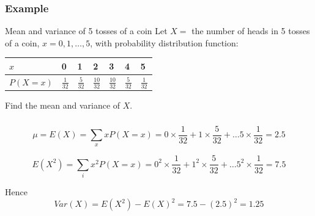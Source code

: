 \documentclass[t,xcolor=pdftex,dvipsnames,table]{beamer}
\begin{document}
\begin{frame}\frametitle{Example}
\begin{block}{Mean and variance of 5 tosses of a coin}
Let $X = $ the number of heads in 5 tosses of a coin, $x=0,1,\ldots,5$, with probability distribution function:

\begin{center}
\begin{tabular}{|l|l|l|l|l|l|l|} \hline
$x$ & 0 & 1 & 2 & 3 & 4 & 5  \\ \hline
$P(X=x)$ & $\frac{1}{32}$ & $\frac{5}{32}$ & $\frac{10}{32}$ & $\frac{10}{32}$ & $\frac{5}{32}$ & $\frac{1}{32}$  \\ \hline
\end{tabular}
\end{center}

Find the mean and variance of $X$.
\end{block}
\end{frame}

\begin{frame}\frametitle{}
\begin{alertblock}{}

\[ \mu = E(X) = \sum_{x} x P(X=x) = 0 \times \frac{1}{32} + 1 \times \frac{5}{32} + \ldots  5 \times \frac{1}{32} = 2.5 \]

\[ E(X^2) = \sum_{i} x^2 P(X=x) = 0^2 \times \frac{1}{32} + 1^2 \times \frac{5}{32} + \ldots  5^2 \times \frac{1}{32} = 7.5 \]

Hence
\[ Var(X) = E(X^2) - E(X)^2 = 7.5 - (2.5)^2 = 1.25  \]

\end{alertblock}
\end{frame}
\end{document}
